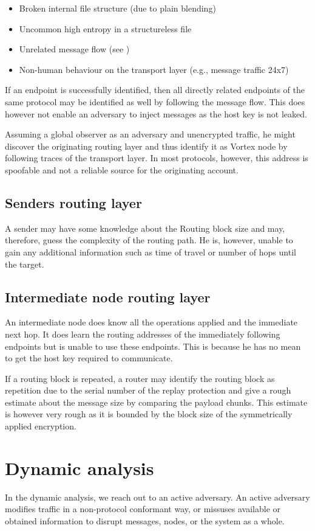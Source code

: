 \begin{itemize}
	\item Broken internal file structure (due to plain blending)
	\item Uncommon high entropy in a structureless file
	\item Unrelated message flow (see \cite{oakland2013-parrot})
	\item Non-human behaviour on the transport layer (e.g., message traffic 24x7)
\end{itemize}

If an endpoint is successfully identified, then all directly related endpoints of the same protocol may be identified as well by following the message flow. This does however not enable an adversary to inject messages as the host key is not leaked. 

Assuming a global observer as an adversary and unencrypted traffic, he might discover the originating routing layer and thus identify it as Vortex node by following traces of the transport layer. In most protocols, however, this address is spoofable and not a reliable source for the originating account.

\section{Senders routing layer}
A sender may have some knowledge about the Routing block size and may, therefore, guess the complexity of the routing path. He is, however, unable to gain any additional information such as time of travel or number of hops until the target.

\section{Intermediate node routing layer}
An intermediate node does know all the operations applied and the immediate next hop. It does learn the routing addresses of the immediately following endpoints but is unable to use these endpoints. This is because he has no mean to get the host key required to communicate.

If a routing block is repeated, a router may identify the routing block as repetition due to the serial number of the replay protection and give a rough estimate about the message size by comparing the payload chunks. This estimate is however very rough as it is bounded by the block size of the symmetrically applied encryption.

\chapter{Dynamic analysis}
In the dynamic analysis, we reach out to an active adversary. An active adversary modifies traffic in a non-protocol conformant way, or missuses available or obtained information to disrupt messages, nodes, or the system as a whole.


